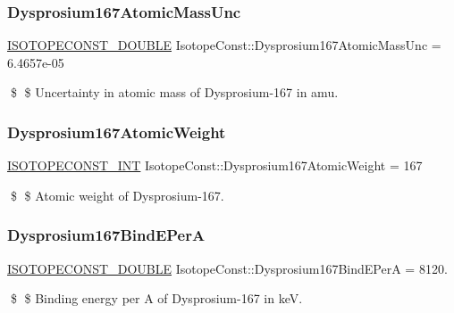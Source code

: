 \subsubsection{\texorpdfstring{Dysprosium167\+Atomic\+Mass\+Unc}{Dysprosium167AtomicMassUnc}}
{\footnotesize\ttfamily \mbox{\hyperlink{group___isotope_const-_macros_ga8f45a7272ce02c0b4c65c44636ed719a}{I\+S\+O\+T\+O\+P\+E\+C\+O\+N\+S\+T\+\_\+\+D\+O\+U\+B\+LE}} Isotope\+Const\+::\+Dysprosium167\+Atomic\+Mass\+Unc = 6.\+4657e-\/05}

\$ \$ Uncertainty in atomic mass of Dysprosium-\/167 in amu. \mbox{\label{group___isotope_const-_dysprosium-_dy167_ga029dc4a670d69c7846ba256c85c07af1}} 
\subsubsection{\texorpdfstring{Dysprosium167\+Atomic\+Weight}{Dysprosium167AtomicWeight}}
{\footnotesize\ttfamily \mbox{\hyperlink{group___isotope_const-_macros_ga5f18360b3e99483a35c32d789e62621c}{I\+S\+O\+T\+O\+P\+E\+C\+O\+N\+S\+T\+\_\+\+I\+NT}} Isotope\+Const\+::\+Dysprosium167\+Atomic\+Weight = 167}

\$ \$ Atomic weight of Dysprosium-\/167. \mbox{\label{group___isotope_const-_dysprosium-_dy167_ga2c35a793b145cd0a4494e0455b54e5a0}} 
\subsubsection{\texorpdfstring{Dysprosium167\+Bind\+E\+PerA}{Dysprosium167BindEPerA}}
{\footnotesize\ttfamily \mbox{\hyperlink{group___isotope_const-_macros_ga8f45a7272ce02c0b4c65c44636ed719a}{I\+S\+O\+T\+O\+P\+E\+C\+O\+N\+S\+T\+\_\+\+D\+O\+U\+B\+LE}} Isotope\+Const\+::\+Dysprosium167\+Bind\+E\+PerA = 8120.}

\$ \$ Binding energy per A of Dysprosium-\/167 in keV. \mbox{\label{group___isotope_const-_dysprosium-_dy167_ga01cf2657ec0ef7d6fecad5dd5c1929ca}} 

